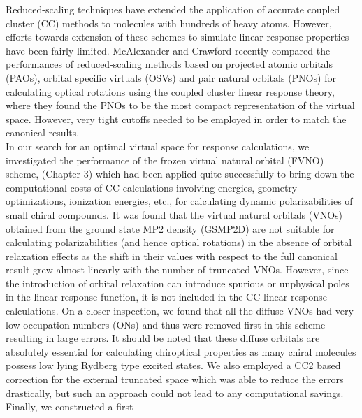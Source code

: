 Reduced-scaling techniques have extended the application of accurate coupled cluster (CC)
methods to molecules with hundreds of heavy atoms\cite{NeeseCCSD09,Neese09}. However, efforts towards extension 
of these schemes to simulate linear response properties have been fairly 
limited\cite{Friedrich15,Gauss00,Korona04,McAlexander12,Russ04,Russ08}. McAlexander and Crawford\cite{McAlexander15:LRCC} recently compared the performances of
reduced-scaling methods based on projected atomic orbitals (PAOs)\cite{Pulay83,Saebo86,PulaySaebo93}, 
orbital specific virtuals (OSVs)\cite{Yang12} and pair natural orbitals (PNOs)\cite{Ahlrichs75,Edmiston66,Meyer73,Neese09} 
for calculating optical rotations using the coupled cluster linear response theory\cite{Koch90}, where they found the 
PNOs to be the most compact representation of the virtual space. However, very tight cutoffs needed to be employed in order to 
match the canonical results. \\
In our search for an optimal virtual space for response calculations,
we investigated the performance of the frozen virtual natural orbital (FVNO) scheme,
(Chapter 3) which had been applied quite successfully to bring down the 
computational costs of CC calculations involving energies, geometry optimizations, 
ionization energies, etc.\cite{DePrince13,DePrince13:FNOs,Landau10,Sosa89,Taube05,Taube08}, 
for calculating dynamic polarizabilities of 
small chiral compounds\cite{Kumar17}. It was found that the virtual natural orbitals (VNOs)
obtained from the ground state MP2 density (GSMP2D) are not suitable for calculating 
polarizabilities (and hence optical rotations) in the absence of orbital relaxation 
effects as the shift in their values with respect to the full canonical result grew 
almost linearly with the number of truncated VNOs. However, since the introduction of orbital
relaxation can introduce spurious or unphysical poles in the linear response function,
it is not included in the CC linear response calculations.
On a closer inspection, we found that all the diffuse 
VNOs had very low occupation numbers (ONs) and thus were removed first
in this scheme resulting in large errors. It should be noted that these 
diffuse orbitals are absolutely essential for calculating chiroptical properties 
as many chiral molecules possess low lying Rydberg type excited states.
We also employed a CC2\cite{Christiansen95:CC2} based correction for the external truncated 
space which was able to reduce the errors drastically, but such an approach 
could not lead to any computational savings. Finally, we constructed a first 
